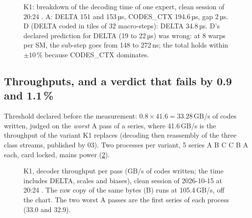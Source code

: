 \begin{figure}[!htbp]
\centering
\GrapheNoyDecomposition
\caption[K1: breakdown of the time of an expert]{K1: breakdown of the decoding time of one expert, clean session of 20:24 \mes. A: DELTA 151 and 153\,µs, CODES\_CTX 194.6\,µs, gap 2\,µs. D (DELTA coded in tiles of 32 macro-steps): DELTA 34.8\,µs. D's declared prediction for DELTA (19 to 22\,µs) was wrong: at 8 warps per SM, the sub-step goes from 148 to 272\,ns; the total holds within $\pm 10\,\%$ because CODES\_CTX dominates.}
\label{fig:t2n-decomposition}
\end{figure}

\subsection{Throughputs, and a verdict that fails by 0.9 and 1.1\,\%}

Threshold declared before the measurement: $0.8 \times 41.6 = 33.28$\,GB/s of codes written, judged on the \emph{worst} A pass of a series, where 41.6\,GB/s is the throughput of the variant K1 replaces (decoding then reassembly of the three class streams, published by 03). Two processes per variant, 5 series A B C C B A each, card locked, mains power (\cref{fig:t2n-decodeur}).

\begin{figure}[!htbp]
\centering
\GrapheNoyDecodeur
\caption[K1: decoder throughput per pass]{K1, decoder throughput per pass (GB/s of codes written; the time includes DELTA, scales and biases), clean session of 2026-10-15 at 20:24 \mes. The raw copy of the same bytes (B) runs at 105.4\,GB/s, off the chart. The two worst A passes are the first series of each process (33.0 and 32.9).}
\label{fig:t2n-decodeur}
\end{figure}

